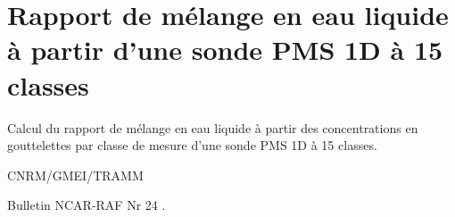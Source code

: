 %
\section{Rapport de m\'elange en eau liquide \`a partir d'une sonde PMS
1D \`a 15 classes }

 

Calcul du rapport de m\'elange en eau liquide \`a partir des 
concentrations en gouttelettes par classe de mesure d'une
sonde PMS 1D \`a 15 classes.

\bigskip





CNRM/GMEI/TRAMM

Bulletin NCAR-RAF Nr 24 \cite{RAF-24}.
